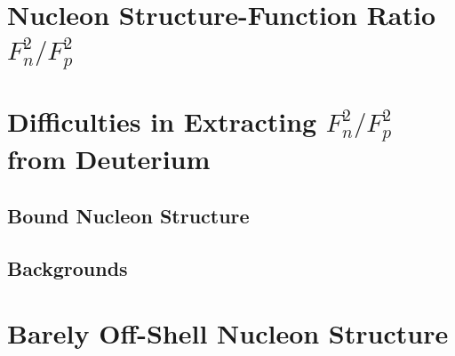 \section{Nucleon Structure-Function Ratio $F^2_n/F^2_p$}
\section{Difficulties in Extracting $F^2_n/F^2_p$ from Deuterium}
\subsection{Bound Nucleon Structure}
\subsection{Backgrounds}
\section{Barely Off-Shell Nucleon Structure}
